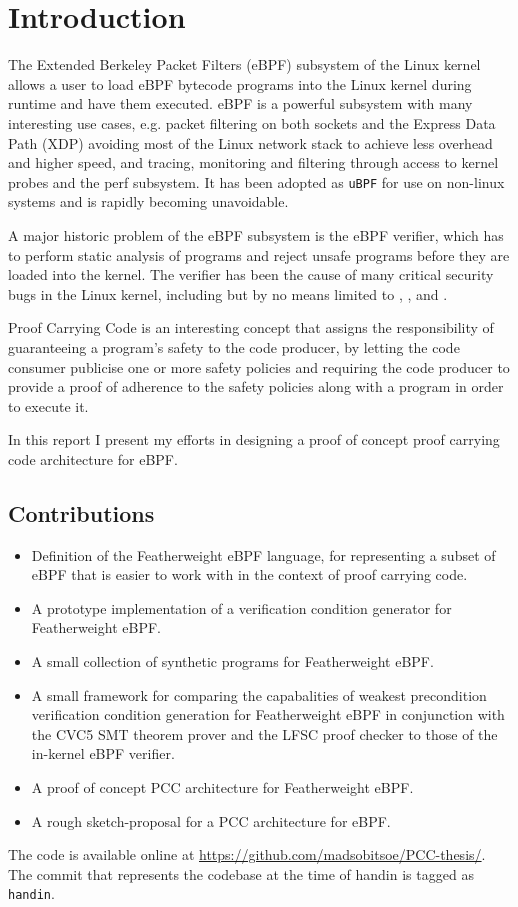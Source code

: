 \section{Introduction}
\label{sec:introduction}

The Extended Berkeley Packet Filters (eBPF) subsystem of the Linux kernel allows a user to load eBPF bytecode programs into the Linux kernel during runtime and have them executed. eBPF is a powerful subsystem with many interesting use cases, e.g. packet filtering on both sockets and the Express Data Path (XDP) avoiding most of the Linux network stack to achieve less overhead and higher speed, and tracing, monitoring and filtering through access to kernel probes and the perf subsystem. It has been adopted as \texttt{uBPF} for use on non-linux systems and is rapidly becoming unavoidable.

A major historic problem of the eBPF subsystem is the eBPF verifier, which has to perform static analysis of programs and reject unsafe programs before they are loaded into the kernel. The verifier has been the cause of many critical security bugs in the Linux kernel, including but by no means limited to \cite{manfred:ebpf}, \cite{manfred:ebpf2}, and \cite{scannell:fuzz}.

Proof Carrying Code is an interesting concept that assigns the responsibility of guaranteeing a program's safety to the code producer, by letting the code consumer publicise one or more safety policies and requiring the code producer to provide a proof of adherence to the safety policies along with a program in order to execute it.

In this report I present my efforts in designing a proof of concept proof carrying code architecture for eBPF.


\subsection{Contributions}
\label{subsec:contributions}

\begin{itemize}
\item Definition of the Featherweight eBPF language, for representing a subset of eBPF that is easier to work with in the context of proof carrying code.
\item A prototype implementation of a verification condition generator for Featherweight eBPF.
\item A small collection of synthetic programs for Featherweight eBPF.
\item A small framework for comparing the capabalities of weakest precondition verification condition generation for Featherweight eBPF in conjunction with the CVC5 SMT theorem prover and the LFSC proof checker to those of the in-kernel eBPF verifier.
\item A proof of concept PCC architecture for Featherweight eBPF.
\item A rough sketch-proposal for a PCC architecture for eBPF.
\end{itemize}

The code is available online at \url{https://github.com/madsobitsoe/PCC-thesis/}. The commit that represents the codebase at the time of handin is tagged as \texttt{handin}.